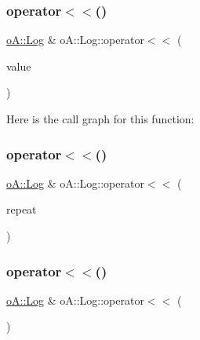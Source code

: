 \subsubsection{\texorpdfstring{operator$<$$<$()}{operator<<()}\hspace{0.1cm}{\footnotesize\ttfamily [7/9]}}
{\footnotesize\ttfamily \mbox{\hyperlink{classo_a_1_1_log}{o\+A\+::\+Log}} \& o\+A\+::\+Log\+::operator$<$$<$ (\begin{DoxyParamCaption}\item[{\mbox{\hyperlink{namespaceo_a_a2bcc976232176d2dcf8b9df1fa33c038}{o\+A\+::\+Double}}}]{value }\end{DoxyParamCaption})}

Here is the call graph for this function\+:
\mbox{\label{classo_a_1_1_log_af5330fde11ac127dba6a6091e5e12b69}} 
\subsubsection{\texorpdfstring{operator$<$$<$()}{operator<<()}\hspace{0.1cm}{\footnotesize\ttfamily [8/9]}}
{\footnotesize\ttfamily \mbox{\hyperlink{classo_a_1_1_log}{o\+A\+::\+Log}} \& o\+A\+::\+Log\+::operator$<$$<$ (\begin{DoxyParamCaption}\item[{\mbox{\hyperlink{classo_a_1_1_repeat}{Repeat}}}]{repeat }\end{DoxyParamCaption})}

\mbox{\label{classo_a_1_1_log_ace93b1b2eda01f9b9a0c81bc8b23083d}} 
\subsubsection{\texorpdfstring{operator$<$$<$()}{operator<<()}\hspace{0.1cm}{\footnotesize\ttfamily [9/9]}}
{\footnotesize\ttfamily \mbox{\hyperlink{classo_a_1_1_log}{o\+A\+::\+Log}} \& o\+A\+::\+Log\+::operator$<$$<$ (\begin{DoxyParamCaption}\item[{\mbox{\hyperlink{classo_a_1_1_endl}{Endl}}}]{ }\end{DoxyParamCaption})}

